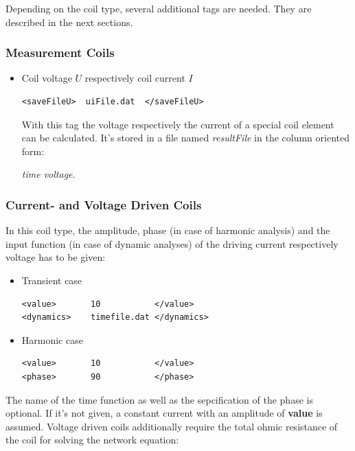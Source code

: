 \noindent
Depending on the coil type, several additional tags are needed. They
are described in the next sections.


\subsubsection{Measurement Coils}

\begin{itemize}
\item Coil voltage $U$ respectively coil current $I$

\begin{verbatim}
<saveFileU>  uiFile.dat  </saveFileU>
\end{verbatim}

  With this tag the voltage respectively the current of a
  special coil element can be calculated. It's stored in a file
  named {\em resultFile} in the column oriented form:

  {\em time voltage}.

\end{itemize}

\subsubsection{Current- and Voltage Driven Coils}
In this coil type, the amplitude, phase (in case of harmonic analysis)
and the input function (in case of dynamic analyses) of the driving
current respectively voltage has to be given:

\begin{itemize}
\item Transient case
\begin{verbatim}
<value>       10           </value>
<dynamics>    timefile.dat </dynamics>
\end{verbatim}

\item Harmonic case
\begin{verbatim}
<value>       10           </value>
<phase>       90           </phase>
\end{verbatim}
\end{itemize}

\noindent
The name of the time function as well as the sepcification of the
phase is optional. If it's not given, a constant current with an
amplitude of {\bf value} is assumed.  
Voltage driven coils additionally require the total ohmic resistance
of the coil for solving the network equation:

